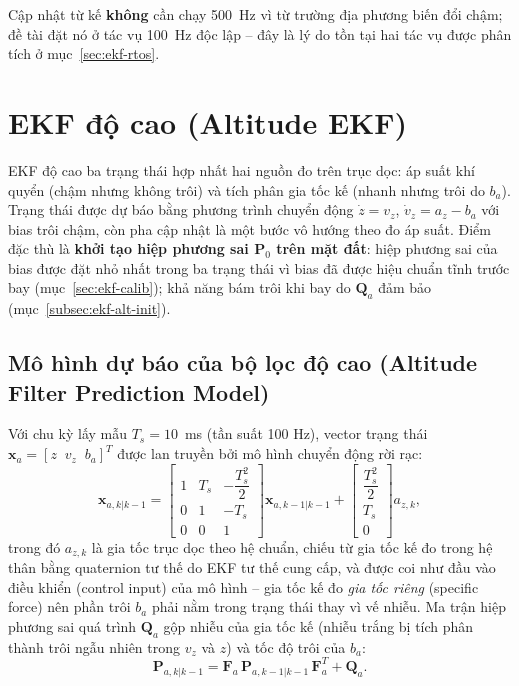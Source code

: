 Cập nhật từ kế \textbf{không} cần chạy 500~Hz vì từ trường địa phương biến đổi chậm; đề tài đặt nó ở tác vụ 100~Hz độc lập -- đây là lý do tồn tại hai tác vụ được phân tích ở mục~\ref{sec:ekf-rtos}.

\section{EKF độ cao (Altitude EKF)}
\label{sec:ekf-alt}

EKF độ cao ba trạng thái hợp nhất hai nguồn đo trên trục dọc: áp suất khí quyển (chậm nhưng không trôi) và tích phân gia tốc kế (nhanh nhưng trôi do $b_a$). Trạng thái được dự báo bằng phương trình chuyển động $\dot{z} = v_z$, $\dot{v}_z = a_z - b_a$ với bias trôi chậm, còn pha cập nhật là một bước vô hướng theo đo áp suất. Điểm đặc thù là \textbf{khởi tạo hiệp phương sai $\mathbf{P}_0$ trên mặt đất}: hiệp phương sai của bias được đặt nhỏ nhất trong ba trạng thái vì bias đã được hiệu chuẩn tĩnh trước bay (mục~\ref{sec:ekf-calib}); khả năng bám trôi khi bay do $\mathbf{Q}_a$ đảm bảo (mục~\ref{subsec:ekf-alt-init}).

\subsection{Mô hình dự báo của bộ lọc độ cao (Altitude Filter Prediction Model)}

Với chu kỳ lấy mẫu $T_s = 10$~ms (tần suất 100 Hz), vector trạng thái $\mathbf{x}_a = \left[z \;\; v_z \;\; b_a\right]^{T}$ được lan truyền bởi mô hình chuyển động rời rạc:
\begin{equation}
\mathbf{x}_{a,k|k-1} =
\begin{bmatrix}
1 & T_s & -\dfrac{T_s^{2}}{2} \\[4pt]
0 & 1   & -T_s \\[2pt]
0 & 0   & 1
\end{bmatrix}
\mathbf{x}_{a,k-1|k-1} +
\begin{bmatrix}
\dfrac{T_s^{2}}{2} \\[4pt]
T_s \\[2pt]
0
\end{bmatrix}
a_{z,k},
\label{eq:alt-predict}
\end{equation}
trong đó $a_{z,k}$ là gia tốc trục dọc theo hệ chuẩn, chiếu từ gia tốc kế đo trong hệ thân bằng quaternion tư thế do EKF tư thế cung cấp, và được coi như đầu vào điều khiển (control input) của mô hình -- gia tốc kế đo \textit{gia tốc riêng} (specific force) nên phần trôi $b_a$ phải nằm trong trạng thái thay vì vế nhiễu. Ma trận hiệp phương sai quá trình $\mathbf{Q}_a$ gộp nhiễu của gia tốc kế (nhiễu trắng bị tích phân thành trôi ngẫu nhiên trong $v_z$ và $z$) và tốc độ trôi của $b_a$:
\begin{equation}
\mathbf{P}_{a,k|k-1} = \mathbf{F}_a\, \mathbf{P}_{a,k-1|k-1}\, \mathbf{F}_a^{T} + \mathbf{Q}_a.
\end{equation}

